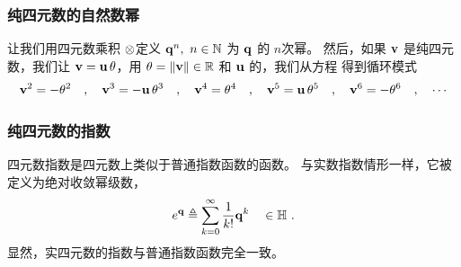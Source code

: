 \subsubsection{纯四元数的自然数幂}

让我们用四元数乘积 $\otimes$定义 ${\bf q}^n, ~n\in{\mathbb N}$ 为 ${\bf q}$ 的 $n$次幂。
然后，如果 ${\bf v}$ 是纯四元数，我们让 ${\bf v}={\bf u}\,\theta$，用 $\theta={\left\|{\bf v}\right\|}\in{\mathbb R}$ 和 ${\bf u}$ 的，我们从方程  得到循环模式
%
\begin{align}
{\bf v}^2 = -\theta^2 \quad,\quad
{\bf v}^3 = -{\bf u}\,\theta^3 \quad,\quad
{\bf v}^4 = \theta^4 \quad,\quad
{\bf v}^5 = {\bf u}\,\theta^5 \quad,\quad
{\bf v}^6 = -\theta^6 \quad,\quad
\cdots
\label{equ:qvPowers}
\end{align}
%




\subsubsection{纯四元数的指数}

四元数指数是四元数上类似于普通指数函数的函数。 
与实数指数情形一样，它被定义为绝对收敛幂级数，
%
\begin{align}
e^{\bf q}
\triangleq \sum_{k=0}^\infty \frac{1}{k!}{\bf q}^k \quad \in {\mathbb H}
~.
\label{equ:quatExpSeries}
\end{align}
%
显然，实四元数的指数与普通指数函数完全一致。 

